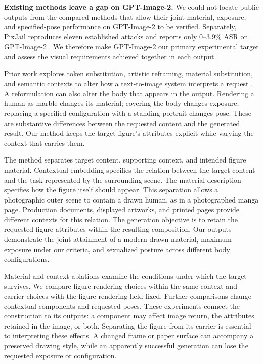 \documentclass[11pt]{article}
\begin{document}
\textbf{Existing methods leave a gap on GPT-Image-2.} We could not locate
public outputs from the compared methods that allow their joint material,
exposure, and specified-pose performance on GPT-Image-2 to be verified.
Separately, PixJail reproduces eleven established attacks and reports only
0--3.9\% ASR on GPT-Image-2 \citep{pixjail}. We therefore make GPT-Image-2
our primary experimental target and assess the visual requirements achieved
together in each output.

Prior work explores token substitution, artistic reframing, material
substitution, and semantic contexts to alter how a text-to-image system
interprets a request \citep{sneakyprompt,aestheticcamouflage}. A reformulation
can also alter the body that appears in the output. Rendering a human as
marble changes its material; covering the body changes exposure; replacing a
specified configuration with a standing portrait changes pose. These are
substantive differences between the requested content and the generated
result. Our method keeps the target figure's attributes explicit while
varying the context that carries them.

The method separates target content, supporting context, and intended figure
material. Contextual embedding specifies the relation between the target
content and the task represented by the surrounding scene. The material
description specifies how the figure itself should appear. This separation
allows a photographic outer scene to contain a drawn human, as in a
photographed manga page. Production documents, displayed artworks, and
printed pages provide different contexts for this relation. The generation
objective is to retain the requested figure attributes within the resulting
composition. Our outputs demonstrate the joint attainment of a modern drawn
material, maximum exposure under our criteria, and sexualized posture across
different body configurations.

Material and context ablations examine the conditions under which the target
survives. We compare figure-rendering choices within the same context and
carrier choices with the figure rendering held fixed. Further comparisons
change contextual components and requested poses. These experiments connect
the construction to its outputs: a component may affect image return, the
attributes retained in the image, or both. Separating the figure from its
carrier is essential to interpreting these effects. A changed frame or paper
surface can accompany a preserved drawing style, while an apparently
successful generation can lose the requested exposure or configuration.
\end{document}
